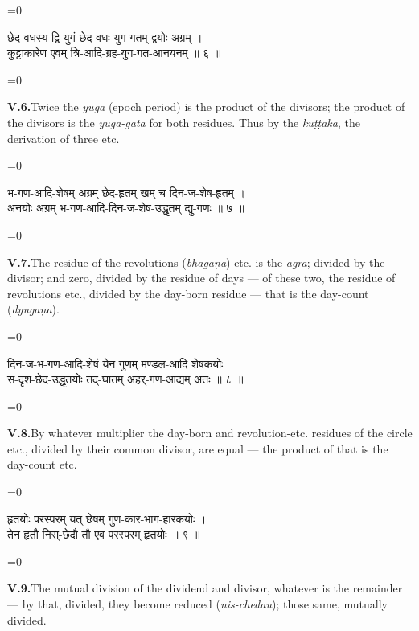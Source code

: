 \documentclass[11pt,a4paper]{article}
\newcommand{\dev}[1]{{\devanagarifont\color{sktcolor}#1}}
\newcommand{\iast}[1]{\textit{#1}}
\newenvironment{paracol}[1]{\begingroup}{\endgroup}
\newcommand{\switchcolumn}[1][]{%
  \ifnum#1=0\relax\else\par\nobreak\vspace{0.5em}\par\nobreak\fi%
}
\begin{document}
\vspace{0.3cm}

\begin{paracol}{2}
\switchcolumn[0]
\dev{%
छेद-वधस्य द्वि-युगं छेद-वधः युग-गतम् द्वयोः अग्रम् ।\\
कुट्टाकारेण एवम् त्रि-आदि-ग्रह-युग-गत-आनयनम् ॥ ६ ॥
}

\switchcolumn[1]
\textbf{V.6.}\quad Twice the \iast{yuga} (epoch period) is the
product of the divisors; the product of the divisors is the
\iast{yuga-gata} for both residues. Thus by the \iast{kuṭṭaka},
the derivation of three etc.
\end{paracol}

\vspace{0.3cm}

\begin{paracol}{2}
\switchcolumn[0]
\dev{%
भ-गण-आदि-शेषम् अग्रम् छेद-हृतम् खम् च दिन-ज-शेष-हृतम् ।\\
अनयोः अग्रम् भ-गण-आदि-दिन-ज-शेष-उद्धृतम् द्यु-गणः ॥ ७ ॥
}

\switchcolumn[1]
\textbf{V.7.}\quad The residue of the revolutions (\iast{bhagaṇa})
etc.
is the \iast{agra}; divided by the divisor; and zero, divided by
the residue of days — of these two, the residue of revolutions etc.,
divided by the day-born residue — that is the day-count
(\iast{dyugaṇa}).
\end{paracol}

\vspace{0.3cm}

\begin{paracol}{2}
\switchcolumn[0]
\dev{%
दिन-ज-भ-गण-आदि-शेषं येन गुणम् मण्डल-आदि शेषकयोः ।\\
स-दृश-छेद-उद्धृतयोः तद्-घातम् अहर्-गण-आद्यम् अतः ॥ ८ ॥
}

\switchcolumn[1]
\textbf{V.8.}\quad By whatever multiplier the day-born and
revolution-etc. residues of the circle etc., divided by their
common divisor, are equal — the product of that is the day-count
etc.
\end{paracol}

\vspace{0.3cm}

\begin{paracol}{2}
\switchcolumn[0]
\dev{%
हृतयोः परस्परम् यत् छेषम् गुण-कार-भाग-हारकयोः ।\\
तेन हृतौ निस्-छेदौ तौ एव परस्परम् हृतयोः ॥ ९ ॥
}

\switchcolumn[1]
\textbf{V.9.}\quad The mutual division of the dividend and divisor,
whatever is the remainder — by that, divided, they become
reduced (\iast{nis-chedau}); those same, mutually divided.
\end{paracol}
\end{document}
